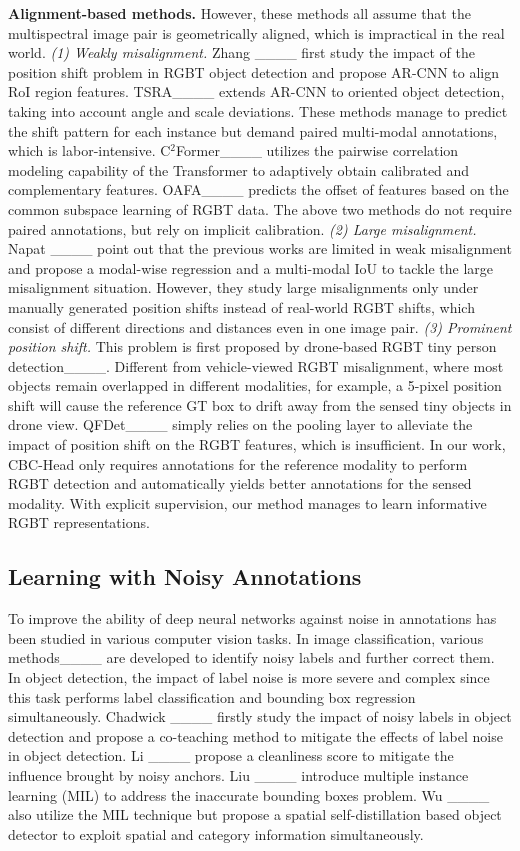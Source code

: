 \textbf{Alignment-based methods.} 
However, these methods all assume that the multispectral image pair is geometrically aligned, which is impractical in the real world. 
\textit{(1) Weakly misalignment.} Zhang \etal____ first study the impact of the position shift problem in RGBT object detection and propose AR-CNN to align RoI region features. TSRA____ extends AR-CNN to oriented object detection, taking into account angle and scale deviations. These methods manage to predict the shift pattern for each instance but demand paired multi-modal annotations, which is labor-intensive. C$^2$Former____ utilizes the pairwise correlation modeling capability of the Transformer to adaptively obtain calibrated and complementary features. OAFA____ predicts the offset of features based on the common subspace learning of RGBT data. The above two methods do not require paired annotations, but rely on implicit calibration. 
\textit{(2) Large misalignment.} Napat \etal____ point out that the previous works are limited in weak misalignment and propose a modal-wise regression and a multi-modal IoU to tackle the large misalignment situation. However, they study large misalignments only under manually generated position shifts instead of real-world RGBT shifts, which consist of different directions and distances even in one image pair. 
\textit{(3) Prominent position shift.} This problem is first proposed by drone-based RGBT tiny person detection____. Different from vehicle-viewed RGBT misalignment, where most objects remain overlapped in different modalities, for example, a 5-pixel position shift will cause the reference GT box to drift away from the sensed tiny objects in drone view. QFDet____ simply relies on the pooling layer to alleviate the impact of position shift on the RGBT features, which is insufficient.
In our work, CBC-Head only requires annotations for the reference modality to perform RGBT detection and automatically yields better annotations for the sensed modality. With explicit supervision, our method manages to learn informative RGBT representations.

\subsection{Learning with Noisy Annotations}
To improve the ability of deep neural networks against noise in annotations has been studied in various computer vision tasks. In image classification, various methods____ are developed to identify noisy labels and further correct them. In object detection, the impact of label noise is more severe and complex since this task performs label classification and bounding box regression simultaneously. Chadwick \etal____ firstly study the impact of noisy labels in object detection and propose a co-teaching method to mitigate the effects of label noise in object detection. Li \etal____ propose a cleanliness score to mitigate the influence brought by noisy anchors. Liu \etal____ introduce multiple instance learning (MIL) to address the inaccurate bounding boxes problem. Wu \etal____ also utilize the MIL technique but propose a spatial self-distillation based object detector to exploit spatial and category information simultaneously. 

